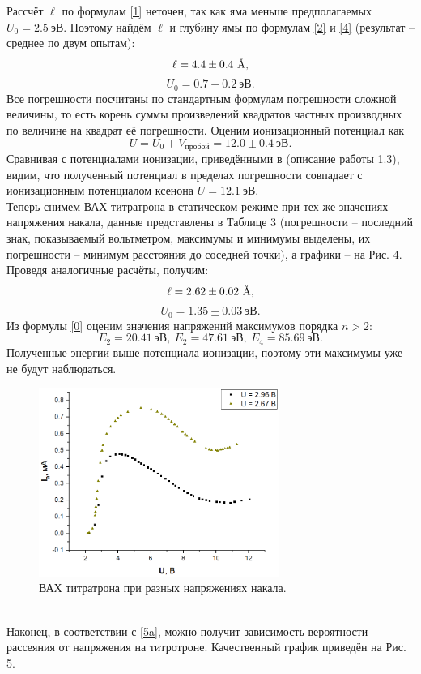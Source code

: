 \documentclass[a4paper,12pt]{article}
\newcommand{\angstrom}{\text{\normalfont\AA}}
\begin{document}
Рассчёт $\ell$ по формулам \eqref{1} неточен, так как яма меньше предполагаемых $U_0 = 2.5~\text{эВ}$. Поэтому найдём $\ell$ и глубину ямы по формулам \eqref{2} и \eqref{4} (результат -- среднее по двум опытам):
\[\ell = 4.4 \pm 0.4~\angstrom,\]
\[U_0 = 0.7 \pm 0.2~\text{эВ}.\]
Все погрешности посчитаны по стандартным формулам погрешности сложной величины, то есть корень суммы произведений квадратов частных производных по величине на квадрат её погрешности. Оценим ионизационный потенциал как 
\[U = U_0 + V_{\text{пробой}} = 12.0 \pm 0.4~\text{эВ}.\]
Сравнивая с потенциалами ионизации, приведёнными в \cite{laba} (описание работы 1.3), видим, что полученный потенциал в пределах погрешности совпадает с ионизационным потенциалом ксенона $U = 12.1~\text{эВ}$.\\
Теперь снимем ВАХ титратрона в статическом режиме при тех же значениях напряжения накала, данные представлены в Таблице 3 (погрешности -- последний знак, показываемый вольтметром, максимумы и минимумы выделены, их погрешности -- минимум расстояния до соседней точки), а графики -- на Рис. 4. Проведя аналогичные расчёты, получим:
\[\ell = 2.62\pm 0.02~\angstrom,\]
\[U_0 = 1.35\pm 0.03~\text{эВ}.\]
Из формулы \eqref{0} оценим значения напряжений максимумов порядка $n > 2$:
\[E_2 = 20.41~\text{эВ},~E_2 = 47.61~\text{эВ},~E_4 = 85.69~\text{эВ}.\]
Полученные энергии выше потенциала ионизации, поэтому эти максимумы уже не будут наблюдаться.
\begin{figure}[h]
\includegraphics[width=0.7\textwidth]{4.png}
\centering
\caption{ВАХ титратрона при разных напряжениях накала.}
\end{figure}\\
Наконец, в соответствии с \eqref{5a}, можно получит зависимость вероятности рассеяния от напряжения на титротроне. Качественный график приведён на Рис. 5. 
\end{document}

